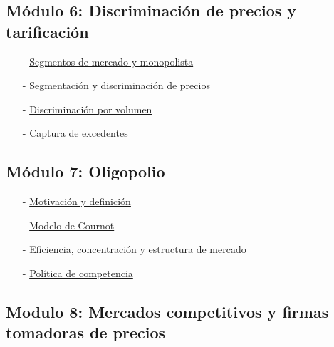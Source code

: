 \subsection*{Módulo 6: Discriminación de precios y tarificación}

\begin{itemize}
    \item[-] \href{https://www.youtube.com/watch?v=NR6JSmtmvkA}{Segmentos de mercado y monopolista}
    
    \item[-] \href{https://www.youtube.com/watch?v=pkvyhRhybI4}{Segmentación y discriminación de precios}
    
    \item[-] \href{https://www.youtube.com/watch?v=HlnLgL_2_jg}{Discriminación por volumen}
    
    \item[-] \href{https://www.youtube.com/watch?v=xHRb9aZVXUA}{Captura de excedentes}
    
\end{itemize}

\subsection*{Módulo 7: Oligopolio}

\begin{itemize}
    \item[-] \href{https://www.youtube.com/watch?v=dAHkFh1iNvk}{Motivación y definición}
    
    \item[-] \href{https://www.youtube.com/watch?v=lz5_zY4xf_Y}{Modelo de Cournot}
    
    \item[-] \href{https://www.youtube.com/watch?v=MC0dFTZrMXk}{Eficiencia, concentración y estructura de mercado}
    
    \item[-] \href{https://www.youtube.com/watch?v=aPzrelUix5w}{Política de competencia} 
    
\end{itemize}

\newcommand{\ytem}[2]{\item[-] \href{#1}{#2}}

\subsection*{Modulo 8: Mercados competitivos y firmas tomadoras de precios}


